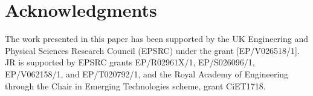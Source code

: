\documentclass[lettersize,journal]{IEEEtran}
\begin{document}
\section*{Acknowledgments}
The work presented in this paper has been supported by the UK Engineering and Physical Sciences Research Council (EPSRC) under the grant [EP/V026518/1]. JR is supported by EPSRC grants EP/R02961X/1, EP/S026096/1, EP/V062158/1, and EP/T020792/1, and the Royal Academy of Engineering through the Chair in Emerging Technologies scheme, grant CiET1718.




\newpage

\vfill
\end{document}
